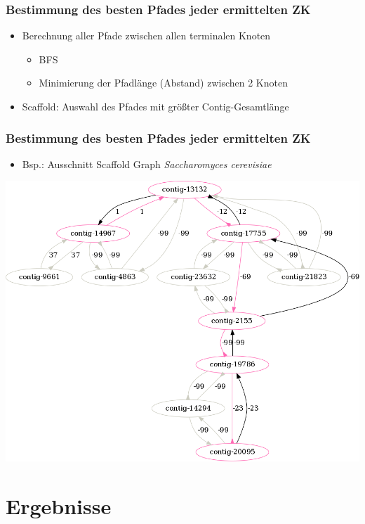 \documentclass[xcolor=pst]{beamer}
\begin{document}
\begin{frame}
  \frametitle{Bestimmung des besten Pfades jeder ermittelten ZK}
  \begin{itemize}
    \item Berechnung aller Pfade zwischen allen terminalen Knoten
    \begin{itemize}
      \item BFS
      \item Minimierung der Pfadlänge (Abstand) zwischen 2 Knoten
    \end{itemize}
    \item Scaffold: Auswahl des Pfades mit größter Contig-Gesamtlänge
  \end{itemize}
\end{frame}

\begin{frame}
  \frametitle{Bestimmung des besten Pfades jeder ermittelten ZK}
  \begin{itemize}
    \item Bsp.: Ausschnitt Scaffold Graph \textit{Saccharomyces cerevisiae}
  \end{itemize}
  \begin{center}
    \includegraphics[scale=0.25]{figures/s_cerevisiae_make_scaffold_example_small.png}
  \end{center}
\end{frame}

\section{Ergebnisse}
\end{document}
